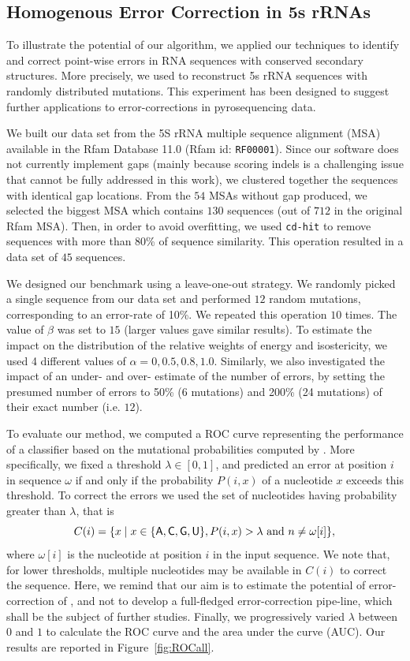 \subsection{Homogenous Error Correction in 5s rRNAs}
\label{sec:5S}
To illustrate the potential of our algorithm, we applied our techniques to identify and correct point-wise errors in RNA sequences
with conserved secondary structures. More precisely, we used \RNApyro to reconstruct 5s rRNA sequences with randomly distributed
mutations. This experiment has been designed to suggest further applications to error-corrections in pyrosequencing data.

We built our data set from the 5S rRNA multiple sequence alignment (MSA) available in the Rfam Database 11.0 (Rfam id: \texttt{RF00001}).
Since our software does not currently implement gaps (mainly because scoring indels is a challenging issue that cannot be fully addressed
in this work),  we clustered together the sequences with identical gap locations. From the $54$ MSAs without gap produced, we selected the
biggest MSA  which contains $130$ sequences (out of $712$ in the original Rfam MSA). Then, in order to avoid overfitting, we used \texttt{cd-hit}
\citep{Li:2006fk} to remove sequences with more than 80\% of sequence similarity. This operation resulted in a data set of $45$ sequences. 

We designed our benchmark using a leave-one-out strategy. We randomly picked a single sequence from our data set and performed $12$ random
mutations, corresponding to an error-rate of 10\%. We repeated this operation $10$ times. The value of $\beta$ was set to $15$ (larger values gave similar results). 
To estimate the impact on the distribution of the relative weights of energy and isostericity, we used 4 different values of $\alpha = {0, 0.5, 0.8, 1.0}$. 
Similarly, we also investigated the impact of an under- and over- estimate of the number of errors, by setting the presumed number of errors to 50\% (6 mutations) and 200\% (24 mutations) of their exact number (i.e. $12$).

To evaluate our method, we computed a ROC curve representing the performance of a classifier based on the mutational probabilities computed
by \RNApyro. More specifically, we fixed a threshold $\lambda \in [0,1]$, and predicted an error at position $i$ in sequence $\omega$ if and only if the
probability $P(i,x)$ of a nucleotide $x$ exceeds this threshold. To correct the errors we used the set of nucleotides having probability
greater than $\lambda$, that is  
$$C(i) = \{ x \; | \;  x \in \{ {\sf{A}},{\sf{C}},{\sf{G}},{\sf{U}} \}, P(i,x) > \lambda \mbox{ and }  n \neq \omega[i] \},$$
 where $\omega[i]$ is
the nucleotide at position $i$ in the input sequence. We note that, for lower thresholds, multiple nucleotides may be available in $C(i)$ to correct
the sequence. Here, we remind that our aim is to estimate the potential of error-correction of \RNApyro, and not to develop a full-fledged error-correction pipe-line, which  
shall be the subject of further studies. Finally, we progressively varied $\lambda$ between $0$ and $1$ to calculate the ROC curve and the area
under the curve (AUC). Our results are reported in Figure~\ref{fig:ROCall}. 


